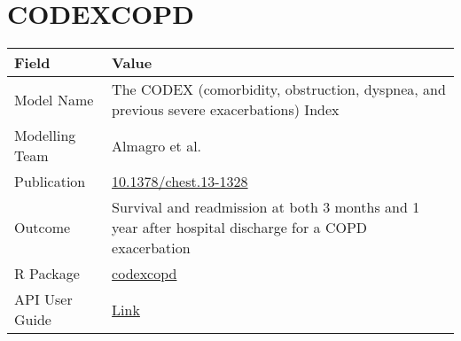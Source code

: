 \documentclass[
]{book}
\begin{document}
\hypertarget{codexcopd}{%
\chapter{CODEXCOPD}\label{codexcopd}}

\begin{longtable}[]{@{}ll@{}}
\toprule
\begin{minipage}[b]{0.45\columnwidth}\raggedright
Field\strut
\end{minipage} & \begin{minipage}[b]{0.49\columnwidth}\raggedright
Value\strut
\end{minipage}\tabularnewline
\midrule
\endhead
\begin{minipage}[t]{0.45\columnwidth}\raggedright
Model Name\strut
\end{minipage} & \begin{minipage}[t]{0.49\columnwidth}\raggedright
The CODEX (comorbidity, obstruction, dyspnea, and previous severe exacerbations) Index\strut
\end{minipage}\tabularnewline
\begin{minipage}[t]{0.45\columnwidth}\raggedright
Modelling Team\strut
\end{minipage} & \begin{minipage}[t]{0.49\columnwidth}\raggedright
Almagro et al.\strut
\end{minipage}\tabularnewline
\begin{minipage}[t]{0.45\columnwidth}\raggedright
Publication\strut
\end{minipage} & \begin{minipage}[t]{0.49\columnwidth}\raggedright
\href{https://doi.org/10.1378/chest.13-1328}{10.1378/chest.13-1328}\strut
\end{minipage}\tabularnewline
\begin{minipage}[t]{0.45\columnwidth}\raggedright
Outcome\strut
\end{minipage} & \begin{minipage}[t]{0.49\columnwidth}\raggedright
Survival and readmission at both 3 months and 1 year after hospital discharge for a COPD exacerbation\strut
\end{minipage}\tabularnewline
\begin{minipage}[t]{0.45\columnwidth}\raggedright
R Package\strut
\end{minipage} & \begin{minipage}[t]{0.49\columnwidth}\raggedright
\href{https://github.com/resplab/codexcopd}{codexcopd}\strut
\end{minipage}\tabularnewline
\begin{minipage}[t]{0.45\columnwidth}\raggedright
API User Guide\strut
\end{minipage} & \begin{minipage}[t]{0.49\columnwidth}\raggedright
\href{https://resplab.github.io/prismguide/api-users-guide.html\#codexcopd}{Link}\strut
\end{minipage}\tabularnewline
\bottomrule
\end{longtable}
\end{document}
